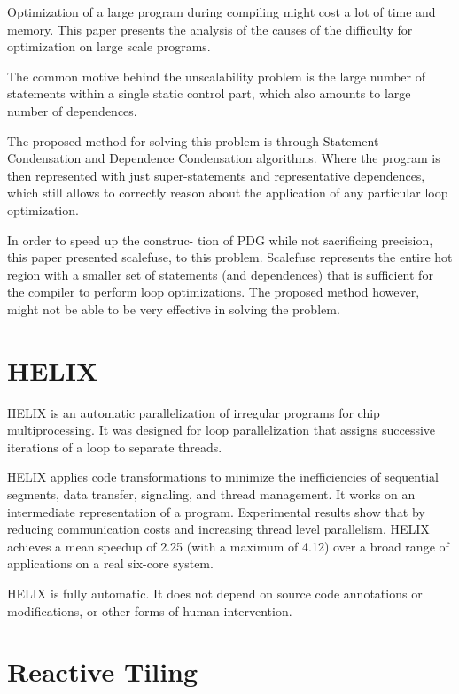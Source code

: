 \documentclass[11pt]{article}
\begin{document}
Optimization of a large program during compiling might cost a lot of time and memory. 
This paper presents the analysis of the causes of the difficulty for optimization on 
large scale programs. 

The common motive behind the unscalability problem is the large number of statements
 within a single static control part, which also amounts to large number of dependences. 


The proposed method for solving this problem is through Statement
 Condensation and Dependence Condensation algorithms. Where the program is then represented with just 
super-statements and representative dependences, which still allows to correctly
 reason about the application of any particular loop optimization. 

 In order to speed up the construc- tion of PDG while not sacrificing precision, 
this paper presented scalefuse, to this problem.
Scalefuse represents the entire hot region with a smaller set of 
statements (and dependences) that is sufficient for the compiler to perform loop optimizations. 
The proposed method however, might not be able to be very effective in solving the problem.

\section{HELIX}
\label{sec:orgheadline6}

HELIX is an automatic parallelization of irregular programs for chip multiprocessing. 
It was designed for loop parallelization that assigns successive iterations of a 
loop to separate threads.

HELIX applies code transformations to minimize the inefficiencies of sequential 
segments, data transfer, signaling, and thread management. It works on
 an intermediate representation of a program. Experimental results show that 
by reducing communication costs and increasing thread level parallelism,
 HELIX achieves a mean speedup of 2.25 (with a maximum of 4.12) 
over a broad range of applications on a real six-core system.

HELIX is fully automatic. It does not depend on source code annotations or 
modifications, or other forms of human intervention.

\section{Reactive Tiling}
\label{sec:orgheadline7}
\end{document}
